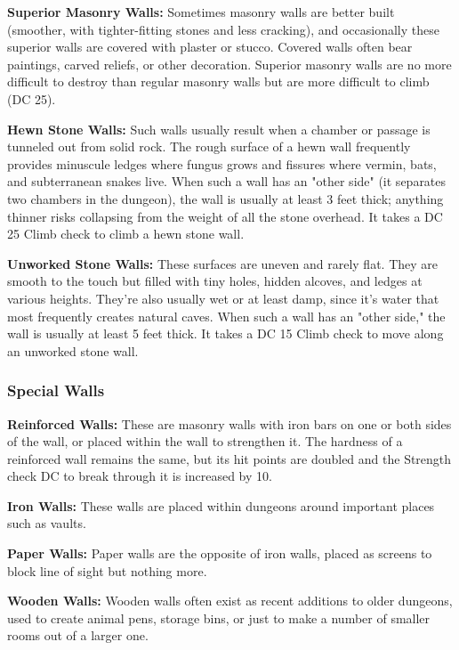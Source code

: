 \textbf{Superior Masonry Walls:} Sometimes masonry walls are better built (smoother, 
with tighter-fitting stones and less cracking), and occasionally these superior 
walls are covered with plaster or stucco. Covered walls often bear paintings, carved 
reliefs, or other decoration. Superior masonry walls are no more difficult to destroy 
than regular masonry walls but are more difficult to climb (DC 25).

\textbf{Hewn Stone Walls:} Such walls usually result when a chamber or passage 
is tunneled out from solid rock. The rough surface of a hewn wall frequently provides 
minuscule ledges where fungus grows and fissures where vermin, bats, and subterranean 
snakes live. When such a wall has an "other side" (it separates two chambers 
in the dungeon), the wall is usually at least 3 feet thick; anything thinner risks 
collapsing from the weight of all the stone overhead. It takes a DC 25 Climb check 
to climb a hewn stone wall.

\textbf{Unworked Stone Walls:} These surfaces are uneven and rarely flat. They 
are smooth to the touch but filled with tiny holes, hidden alcoves, and ledges 
at various heights. They're also usually wet or at least damp, since it's water 
that most frequently creates natural caves. When such a wall has an "other side," 
the wall is usually at least 5 feet thick. It takes a DC 15 Climb check to move 
along an unworked stone wall. 

\subsubsection{Special Walls}

\textbf{Reinforced Walls:} These are masonry walls with iron bars on one 
or both sides of the wall, or placed within the wall to strengthen it. The hardness 
of a reinforced wall remains the same, but its hit points are doubled and the Strength 
check DC to break through it is increased by 10.

\textbf{Iron Walls:} These walls are placed within dungeons around important places 
such as vaults. 

\textbf{Paper Walls:} Paper walls are the opposite of iron walls, placed 
as screens to block line of sight but nothing more.

\textbf{Wooden Walls:} Wooden walls often exist as recent additions to 
older dungeons, used to create animal pens, storage bins, or just to make a number 
of smaller rooms out of a larger one.

